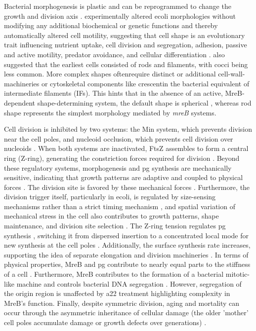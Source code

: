 Bacterial morphogenesis is plastic and can be reprogrammed to change the growth and
division axis \cite{denBlaauwen2018}.  \cite{Takeuchi2005} experimentally altered
\ac{ecoli} morphologies without modifying any additional biochemical or genetic functions
and thereby automatically altered cell motility, suggesting that cell shape is an
evolutionary trait influencing nutrient uptake, cell division and segregation, adhesion,
passive and active motility, predator avoidance, and cellular differentiation
\cite{Young2006}. \cite{Young2006} also suggested that the earliest cells consisted of
rods and filaments, with cocci being less common. More complex shapes oftenrequire
distinct or additional cell-wall-machineries \cite{Zapun2008} or cytoskeletal components
like crescentin the bacterial equivalent of intermediate filaments
(IFs)\cite{Ausmees2003}. This hints that in the absence of an active, MreB-dependent
shape-determining system, the default shape is spherical \cite{Jones2001}, whereas rod
shape represents the simplest morphology mediated by \textit{mreB} systems.

Cell division is inhibited by two systems: the Min system, which prevents division near
the cell poles, and nucleoid occlusion, which prevents cell division over nucleoids
\cite{Bramkamp2009, Oliva2004}. When both systems are inactivated, FtsZ assembles to form
a central ring (Z-ring), generating the constriction forces required for division \cite{Li2007}.
Beyond these regulatory systems, morphogenesis and \ac{pg} synthesis are mechanically
sensitive, indicating that growth patterns are adaptive and coupled to physical forces
\cite{Si2015}. The division site is favored by these mechanical forces \cite{Li2007,
Koch1995, Chatterjee1988}. Furthermore, the division trigger itself, particularly in
\ac{ecoli}, is regulated by size-sensing mechanisms rather than a strict timing mechanism
\cite{Robert2014}, and spatial variation of mechanical stress in the cell also
contributes to growth patterns, shape maintenance, and division site selection
\cite{Chatterjee1988}.
The Z-ring tension regulates \ac{pg} synthesis \cite{Lan2007}, switching it from
dispersed insertion to a concentrated local mode for new synthesis at the cell poles
\cite{DenBlaauwen2008}. Additionally, the surface synthesis rate increases, supporting
the idea of separate elongation and division machineries  \cite{Woldringh1987,
Cooper1991}. In terms of physical properties, MreB and \ac{pg} contribute to nearly equal
parts to the stiffness of a cell \cite{Wang2010, Wang2010_protocol}. Furthermore, MreB
contributes to the formation of a bacterial mitotic-like machine and controls bacterial
DNA segregation  \cite{Kruse2005, Gitai2005}.
However, segregation of the origin region is unaffected by \ac{a22} treatment
\cite{Karczmarek2007} highlighting complexity in MreB's function. Finally, despite
symmetric division, aging and mortality can occur through the asymmetric inheritance of
cellular damage (the older 'mother' cell poles accumulate damage or growth defects over
generations) \cite{Stewart2005}.

